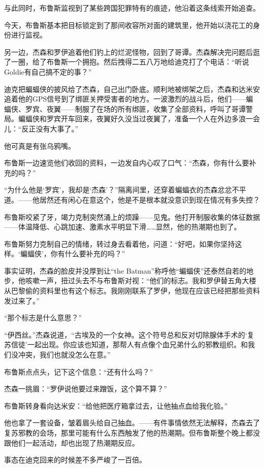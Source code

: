 \documentclass[../main]{subfiles}
\begin{document}
与此同时，布鲁斯监视到了某些跨国犯罪特有的痕迹，他沿着这条线索开始追查。

今天，布鲁斯基本把目标锁定到了那间收容所对面的建筑里，他开始以浇花工的身份进行监视。

另一边，杰森和罗伊追着他们钓上的烂泥怪物，回到了哥谭。杰森解决完问题后逛了一圈，给了布鲁斯一个拥抱。然后拽得二五八万地给迪克打了个电话：“听说Goldie有自己搞不定的事？”

迪克把蝙蝠侠的披风给了杰森，自己出门卧底。顺利地被绑架之后，杰森和达米安追着他的GPS信号到了绑匪关押受害者的地方。一波激烈的战斗后，他们——蝙蝠侠、罗宾、夜翼——制服了在场的所有绑匪，收集了全部资料，呼叫了哥谭警局。蝙蝠侠和罗宾开车回来，夜翼好久没当过夜翼了，准备一个人在外边多浪一会儿：“反正没有大事了。”

他可真是有张乌鸦嘴。

布鲁斯一边速览他们收回的资料，一边发自内心叹了口气：“杰森，你有什么要补充的吗？”

“为什么他是`罗宾'，我却是`杰森'？”隔离间里，还穿着蝙蝠衣的杰森忿忿不平道。——他居然还有闲心在意这个，他是不是根本就没意识到现在情况有多失控？

布鲁斯咬紧了牙，竭力克制突然涌上的烦躁——见鬼。他打开制服收集的体征数据——体温降低、心跳加速、激素水平明显下滑……显然，他的热潮期也到了。

布鲁斯努力克制自己的情绪，转过身去看着他，问道：“好吧，如果你坚持这样。`蝙蝠侠'，你有什么要补充的吗？”

事实证明，杰森的脸皮并没厚到让“the
Batman”称呼他“蝙蝠侠”还泰然自若的地步，他咳嗽一声，扭过头去不与布鲁斯对视：“他们的标志。我和罗伊替五角大楼从巴黎偷的资料里也有这个标志。我刚刚联系了罗伊，他现在应该已经把那些资料发过来了。”

“那个标志是什么意思？”

“伊西丝。”杰森说道，“古埃及的一个女神。这个符号总和反对切除腺体手术的`复苏信徒'一起出现。你应该也知道，那帮人有点像个血兄弟什么的邪教组织。和我们没冲突，我们也就没怎么在意。”

布鲁斯点点头，记下这个信息：“还有什么吗？”

杰森一挑眉：“罗伊说他要过来蹭饭，这个算不算？”

布鲁斯转身看向达米安：“给他把医疗箱拿过去，让他抽点血给我化验。”

他也拿了一套设备，皱着眉头给自己抽血。——有件事情依然无法解释，杰森去了复苏邪教的会场，那里可能有什么东西触发了他的热潮期。但布鲁斯整个晚上都没跟他们一起活动，却也出现了热潮期反应。

事态在迪克回来的时候差不多严峻了一百倍。
\end{document}
